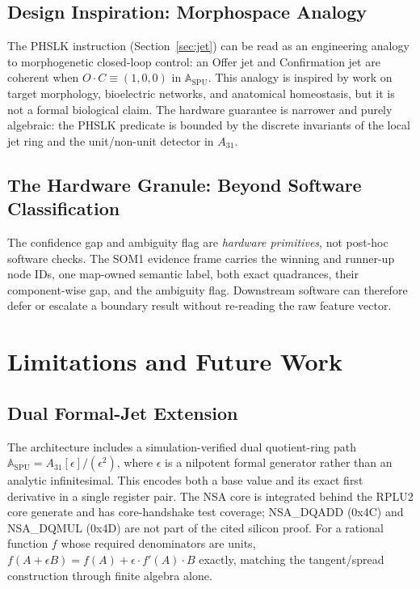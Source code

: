 \documentclass[conference]{IEEEtran}
\begin{document}
\subsection{Design Inspiration: Morphospace Analogy}

The PHSLK instruction (Section~\ref{sec:jet}) can be read as an engineering
analogy to morphogenetic closed-loop control: an Offer jet and Confirmation
jet are coherent when $O\cdot C \equiv (1,0,0)$ in
$\mathbb{A}_{\text{SPU}}$. This analogy is inspired by work on target
morphology, bioelectric networks, and anatomical homeostasis, but it is not a
formal biological claim. The hardware guarantee is narrower and purely
algebraic: the PHSLK predicate is bounded by the discrete invariants of the
local jet ring and the unit/non-unit detector in $A_{31}$.

\subsection{The Hardware Granule: Beyond Software Classification}

The confidence gap and ambiguity flag are \emph{hardware primitives}, not
post-hoc software checks. The SOM1 evidence frame carries the winning and
runner-up node IDs, one map-owned semantic label, both exact quadrances, their
component-wise gap, and the ambiguity flag. Downstream software can therefore
defer or escalate a boundary result without re-reading the raw feature vector.

\section{Limitations and Future Work}
\label{sec:future}

\subsection{Dual Formal-Jet Extension}

The architecture includes a simulation-verified dual quotient-ring path
$\mathbb{A}_{\text{SPU}} = A_{31}[\epsilon]/(\epsilon^2)$, where
$\epsilon$ is a nilpotent formal generator rather than an analytic
infinitesimal. This encodes both a base value and its exact first derivative
in a single register pair. The NSA core is integrated behind the RPLU2 core
generate and has core-handshake test coverage; NSA\_DQADD (0x4C) and
NSA\_DQMUL (0x4D) are not part of the cited silicon proof. For a rational function $f$ whose
required denominators are units, $f(A + \epsilon B) =
f(A) + \epsilon \cdot f'(A) \cdot B$ exactly, matching the tangent/spread
construction through finite algebra alone.
\end{document}
